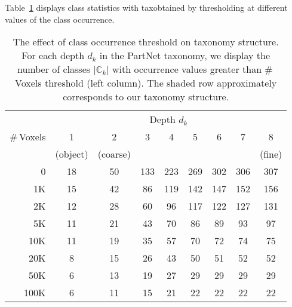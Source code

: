 

Table~\ref{tab:taxonomy_structure_by_threshold} displays class statistics with taxobtained by thresholding at different values of the class occurrence. 


\begin{table}[!ht]
    \centering
    \caption{The effect of class occurrence threshold on taxonomy structure. For each depth $d_k$ in the PartNet taxonomy, we display the number of classes $|\mathbb{C}_k|$ with occurrence values greater than \#\,Voxels threshold (left column). The shaded row approximately corresponds to our taxonomy structure.}
    \begin{tabular}{r cccccccc}
        \toprule
        & \multicolumn{8}{c}{Depth $d_k$} \\
        \cmidrule{2-9}
        \#\,Voxels & 1 & 2 & 3 & 4 & 5 & 6 & 7 & 8 \\
         & (object) & (coarse) & & & & & & (fine) \\
        \midrule
        0    & 18 & 50 & 133 & 223 & 269 & 302 & 306 & 307 \\
        1K   & 15 & 42 &  86 & 119 & 142 & 147 & 152 & 156 \\
        \rowcolor{LightGray}
        2K   & 12 & 28 &  60 &  96 & 117 & 122 & 127 & 131 \\
        5K   & 11 & 21 &  43 &  70 &  86 &  89 &  93 &  97 \\
        10K  & 11 & 19 &  35 &  57 &  70 &  72 &  74 &  75 \\
        20K  &  8 & 15 &  26 &  43 &  50 &  51 &  52 &  52 \\
        50K  &  6 & 13 &  19 &  27 &  29 &  29 &  29 &  29 \\
        100K &  6 & 11 &  15 &  21 &  22 &  22 &  22 &  22 \\
        \bottomrule
    \end{tabular}
    \label{tab:taxonomy_structure_by_threshold}
\end{table}



